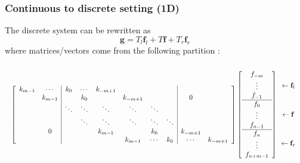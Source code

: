 \documentclass[t]{beamer}
\newcommand{\gVec}{\mathbf{g}}	%
\newcommand{\fVec}{\mathbf{f}}	%
\begin{document}
\begin{frame}
\frametitle{Continuous to discrete setting (1D)}
The discrete system can be rewritten as
\[\gVec = T_{l}\fVec_{l} + T\fVec + T_{r}\fVec_{r}\]
where matrices/vectors come from the following partition \cite{NeumannDCT}:
\[\resizebox{1 \textwidth}{!}{$
\left[\begin{array}{cc|cccccc|cc}
k_{m-1} & \cdots & k_0 & \cdots & k_{-m+1} & & & & & \\
 & k_{m-1} & & k_0 & & k_{-m+1} & & & 0 & \\
 & & \ddots & \ddots & \ddots & \ddots & \ddots & & & \\
 & & & \ddots & \ddots & \ddots & \ddots & \ddots & & \\
 & 0 & & & k_{m-1} & & k_0 & & k_{-m+1} & \\
 & & & & & k_{m-1} & \cdots & k_0 & \cdots & k_{-m+1} 
\end{array}\right]\left[\begin{array}{c}
f_{-m} \\
\vdots \\
f_{-1} \\
\hline 
f_0 \\
\vdots \\
f_{n-1} \\
\hline
f_n \\
\vdots \\
f_{n+m-1}
\end{array}\right]\begin{array}{c}
\vspace*{0.25 in} \\
\leftarrow \fVec_l \\
\vspace*{0.25 in} \\
\leftarrow \fVec \\
\vspace*{0.25 in} \\
\leftarrow \fVec_r \\
\vspace*{0.25 in} 
\end{array}$}\]
\end{frame}
\end{document}
